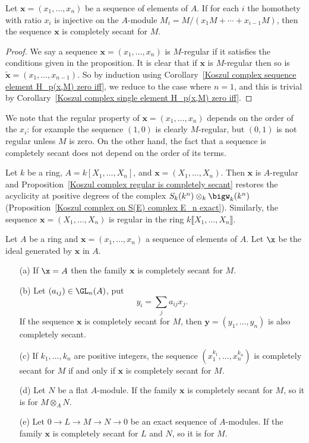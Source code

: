 \begin{proposition}\label{Koszul complex regular is completely secant}
Let $\bm{x}=(x_1,\dots,x_n)$ be a sequence of elements of $A$. If for each $i$ the homothety with ratio $x_i$ is injective on the $A$-module $M_i=M/(x_1M+\cdots+x_{i-1}M)$, then the sequence $\bm{x}$ is completely secant for $M$.
\end{proposition}
\begin{proof}
We say a sequence $\bm{x}=(x_1,\dots,x_n)$ is $M$-regular if it satisfies the conditions given in the proposition. It is clear that if $\bm{x}$ is $M$-regular then so is $\tilde{\bm{x}}=(x_1,\dots,x_{n-1})$. So by induction using Corollary~\ref{Koszul complex sequence element H_p(x,M) zero iff}, we reduce to the case where $n=1$, and this is trivial by Corollary~\ref{Koszul complex single element H_p(x,M) zero iff}.
\end{proof}
We note that the regular property of $\bm{x}=(x_1,\dots,x_n)$ depends on the order of the $x_i$: for example the sequence $(1,0)$ is clearly $M$-regular, but $(0,1)$ is not regular unless $M$ is zero. On the other hand, the fact that a sequence is completely secant does not depend on the order of its terms.
\begin{example}
Let $k$ be a ring, $A=k[X_1,\dots,X_n]$, and $\bm{x}=(X_1,\dots,X_n)$. Then $\bm{x}$ is $A$-regular and Proposition~\ref{Koszul complex regular is completely secant} restores the acyclicity at positive degrees of the complex $S_k(k^n)\otimes_k\bigw_k(k^n)$ (Proposition~\ref{Koszul complex on S(E) complex E_n exact}). Similarly, the sequence $\bm{x}=(X_1,\dots,X_n)$ is regular in the ring $k\llbracket X_1,\dots,X_n\rrbracket$.
\end{example}
\begin{proposition}\label{Koszul complex completely secant prop}
Let $A$ be a ring and $\bm{x}=(x_1,\dots,x_n)$ a sequence of elements of $A$. Let $\x$ be the ideal generated by $\bm{x}$ in $A$.
\begin{itemize}
\item[(a)] If $\x=A$ then the family $\bm{x}$ is completely secant for $M$.
\item[(b)] Let $(a_{ij})\in\GL_n(A)$, put
\[y_i=\sum_ja_{ij}x_j.\]
If the sequence $\bm{x}$ is completely secant for $M$, then $\bm{y}=(y_1,\dots,y_n)$ is also completely secant.
\item[(c)] If $k_1,\dots,k_n$ are positive integers, the sequence $(x_1^{k_1},\dots,x_n^{k_n})$ is completely secant for $M$ if and only if $\bm{x}$ is completely secant for $M$.
\item[(d)] Let $N$ be a flat $A$-module. If the family $\bm{x}$ is completely secant for $M$, so it is for $M\otimes_AN$.
\item[(e)] Let $0\to L\to M\to N\to 0$ be an exact sequence of $A$-modules. If the family $\bm{x}$ is completely secant for $L$ and $N$, so it is for $M$.
\end{itemize}
\end{proposition}
